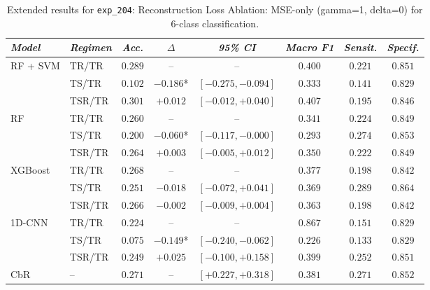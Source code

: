 \begin{table}[H]
\centering
\scriptsize
\caption{Extended results for \texttt{exp\_204}: Reconstruction Loss Ablation: MSE-only (gamma=1, delta=0) for 6-class classification.}
\label{tab:appendix_exp_204}
\begin{tabular*}{\textwidth}{@{\extracolsep{\fill}}llcccccc}
\toprule
\emph{Model} & \emph{Regimen} & \emph{Acc.} & \emph{$\Delta$} & \emph{95\% CI} & \emph{Macro F1} & \emph{Sensit.} & \emph{Specif.}\\
\midrule
\multirow{3}{*}{RF + SVM} & TR/TR & $0.289$ & -- & -- & $0.400$ & $0.221$ & $0.851$\\
 & TS/TR & $0.102$ & $-0.186$* & $[-0.275, -0.094]$ & $0.333$ & $0.141$ & $0.829$\\
 & TSR/TR & $0.301$ & $+0.012$ & $[-0.012, +0.040]$ & $0.407$ & $0.195$ & $0.846$\\
\midrule
\multirow{3}{*}{RF} & TR/TR & $0.260$ & -- & -- & $0.341$ & $0.224$ & $0.849$\\
 & TS/TR & $0.200$ & $-0.060$* & $[-0.117, -0.000]$ & $0.293$ & $0.274$ & $0.853$\\
 & TSR/TR & $0.264$ & $+0.003$ & $[-0.005, +0.012]$ & $0.350$ & $0.222$ & $0.849$\\
\midrule
\multirow{3}{*}{XGBoost} & TR/TR & $0.268$ & -- & -- & $0.377$ & $0.198$ & $0.842$\\
 & TS/TR & $0.251$ & $-0.018$ & $[-0.072, +0.041]$ & $0.369$ & $0.289$ & $0.864$\\
 & TSR/TR & $0.266$ & $-0.002$ & $[-0.009, +0.004]$ & $0.363$ & $0.198$ & $0.842$\\
\midrule
\multirow{3}{*}{1D-CNN} & TR/TR & $0.224$ & -- & -- & $0.867$ & $0.151$ & $0.829$\\
 & TS/TR & $0.075$ & $-0.149$* & $[-0.240, -0.062]$ & $0.226$ & $0.133$ & $0.829$\\
 & TSR/TR & $0.249$ & $+0.025$ & $[-0.100, +0.158]$ & $0.399$ & $0.252$ & $0.851$\\
\midrule
CbR & -- & $0.271$ & -- & $[+0.227, +0.318]$ & $0.381$ & $0.271$ & $0.852$\\
\bottomrule
\end{tabular*}
\end{table}

